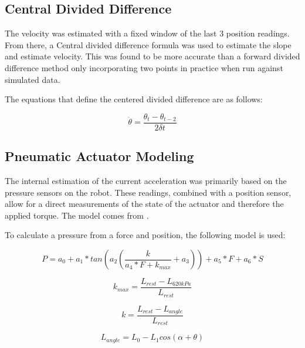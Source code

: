 \subsection{Central Divided Difference}

The velocity was estimated with a fixed window of the last 3 position readings.
From there, a Central divided difference formula was used to estimate the
slope and estimate velocity. This was found to be more accurate than a forward
divided difference method only incorporating two points in practice when run
against simulated data.

The equations that define the centered divided difference are as follows:

\begin{equation}
\dot{\theta} = \dfrac{\theta_{t} - \theta_{t - 2}}{2 \delta t}
\end{equation}


\subsection{Pneumatic Actuator Modeling}

The internal estimation of the current acceleration was primarily based on the 
pressure sensors on the robot. These readings, combined with a position sensor, 
allow for a direct measurements of the state of the actuator and therefore the
applied torque. The model comes from \cite{HuntPMuscles}.

To calculate a pressure from a force and position, the following model is used:

\begin{equation}
P = a_{0} + a_{1} * tan(a_{2} (\dfrac{k}{a_{4} * F + k_{max}} + a_{3})) + a_{5} * F + a_{6} * S
\end{equation}

\begin{equation}
k_{max} = \dfrac{L_{rest} - L_{620 kPa}}{L_{rest}}
\end{equation}

\begin{equation}
k = \dfrac{L_{rest} - L_{angle}}{L_{rest}}
\end{equation}

\begin{equation}
L_{angle} = L_{0} - L_{1} cos(\alpha + \theta)
\end{equation}

